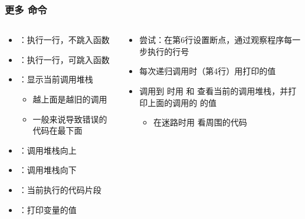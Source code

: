 \begin{frame} [fragile]
	\frametitle{更多  命令}
	\linespread{1.25}
	\begin{columns}[T]
		\begin{column}[T]{.5\textwidth}
			\begin{itemize}
			\item {}：执行一行，不跳入函数
			\item {}：执行一行，可跳入函数
			\item {}：显示当前调用堆栈
				\begin{itemize}
				\item 越上面是越旧的调用
				\item 一般来说导致错误的代码在最下面
				\end{itemize}
			\item {}：调用堆栈向上
			\item {}：调用堆栈向下
			\item {}：当前执行的代码片段
			\item {}：打印变量的值
			\end{itemize}
		\end{column}
		\begin{column}[T]{.5\textwidth}
			\begin{itemize}
			\item 尝试：在第6行设置断点，通过观察程序每一步执行的行号
			\item 每次递归调用时（第4行）用打印的值
			\item 调用到  时用  和
					 查看当前的调用堆栈，并打印上面的调用的
					 的值
				\begin{itemize}
				\item 在迷路时用  看周围的代码
				\end{itemize}
			\end{itemize}
		\end{column}
	\end{columns}
	\begin{comment}
	b 6
	r	# line 6
	s	# line 1
	s	# line 2
	p x	# 			4
	s	# line 4
	s	# line 1
	s	# line 2
	p x	# 			2
	s	# line 4
	s	# line 1
	s	# line 2
	p x	# 			0
	bt
	up	# line 4, stack -2
	p x	# 			2
	up	# line 4, stack -3
	p x	# 			6
	up	# line 6, stack -4
	l	# line 6
	\end{comment}
\end{frame}

